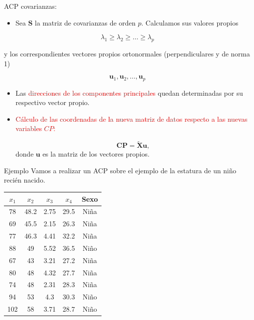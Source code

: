 \documentclass[
  ignorenonframetext,
]{beamer}
\providecommand{\tightlist}{%
  \setlength{\itemsep}{0pt}\setlength{\parskip}{0pt}}
\newcommand\red[1]{\textcolor{red}{#1}}
\begin{document}
\begin{frame}{ACP covarianzas:}
\label{acp-covarianzas-1}
\begin{itemize}
\tightlist
\item
  Sea \(\mathbf{S}\) la matriz de covarianzas de orden \(p\). Calculamos
  sus valores propios
\end{itemize}

\[\lambda_1\geq \lambda_2\geq\ldots\geq\lambda_p\]

y los correspondientes vectores propios ortonormales (perpendiculares y
de norma 1)

\[\mathbf{u}_1,\mathbf{u}_2,\ldots,\mathbf{u}_p\]

\begin{itemize}
\item
  Las \red{direcciones de los componentes principales} quedan
  determinadas por su respectivo vector propio.
\item
  \red{Cálculo de las coordenadas de la nueva matriz de datos respecto
  a las nuevas variables $CP$:}

  \[\mathbf{CP}= \tilde{\mathbf{X}} \mathbf{u},\] donde \(\mathbf{u}\)
  es la matriz de los vectores propios.
\end{itemize}
\end{frame}

\begin{frame}{Ejemplo}
\label{ejemplo}
Vamos a realizar un ACP sobre el ejemplo de la estatura de un niño
recién nacido.

\begin{table}
\centering
\begin{tabular}{|c|c|c|c|c|}\hline
$x_1$ & $x_2$ & $x_3$ & $x_4$&Sexo\\
\hline
78&48.2&2.75&29.5& Niña\\
69&45.5&2.15&26.3& Niña\\
77&46.3&4.41&32.2& Niña\\
88&49&5.52&36.5& Niño\\
67&43&3.21&27.2& Niña\\
80&48&4.32&27.7& Niña\\
74&48&2.31&28.3& Niña\\
94&53&4.3&30.3& Niño\\
102&58&3.71&28.7& Niño
\\
\hline
\end{tabular}
\end{table}
\end{frame}
\end{document}
